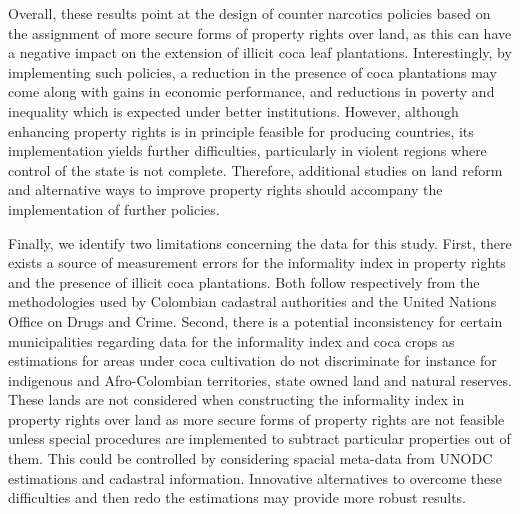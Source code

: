\documentclass[12pt,a4paper,english]{article}%
\begin{document}
Overall, these results point at the design of counter narcotics policies based on the assignment of more secure forms of property rights over land, as this can have a negative impact on the extension of illicit coca leaf plantations. Interestingly, by implementing such policies, a reduction in the presence of coca plantations may come along with gains in economic performance, and reductions in poverty and inequality which is expected under better institutions. However, although enhancing property rights is in principle feasible for producing countries, its implementation yields further difficulties, particularly in violent regions where control of the state is not complete. Therefore, additional studies on land reform and alternative ways to improve property rights should accompany the implementation of further policies.

Finally, we identify two limitations concerning the data for this study. First, there exists a source of measurement errors for the informality index in property rights and the presence of illicit coca plantations. Both follow respectively from the methodologies used by Colombian cadastral authorities and the United Nations Office on Drugs and Crime. Second, there is a potential inconsistency for certain municipalities regarding data for the informality index and coca crops as estimations for areas under coca cultivation do not discriminate for instance for indigenous and Afro-Colombian territories, state owned land and natural reserves. These lands are not considered when constructing the informality index in property rights over land as more secure forms of property rights are not feasible unless special procedures are implemented to subtract particular properties out of them. This could be controlled by considering spacial meta-data from UNODC estimations and cadastral information. Innovative alternatives to overcome these difficulties and then redo the estimations may provide more robust results.

\newpage
\end{document}
